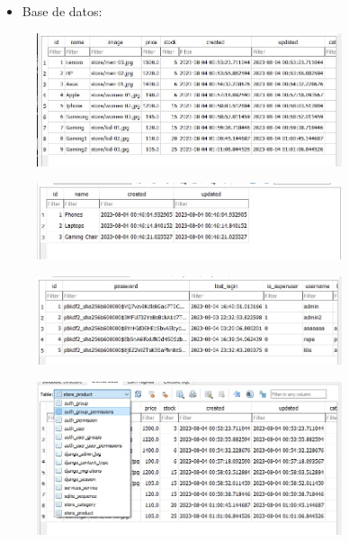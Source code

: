 \begin{itemize}	
	\item Base de datos:
\end{itemize}
\begin{figure}[H]
	\centering
	\includegraphics[width=0.8\textwidth,keepaspectratio]{img/imagen7.jpg}
\end{figure}
\begin{figure}[H]
	\centering
	\includegraphics[width=0.8\textwidth,keepaspectratio]{img/imagen8.jpg}
\end{figure}
\begin{figure}[H]
	\centering
	\includegraphics[width=0.8\textwidth,keepaspectratio]{img/imagen9.jpg}
\end{figure}
\begin{figure}[H]
	\centering
	\includegraphics[width=0.8\textwidth,keepaspectratio]{img/imagen10.jpg}
\end{figure}

